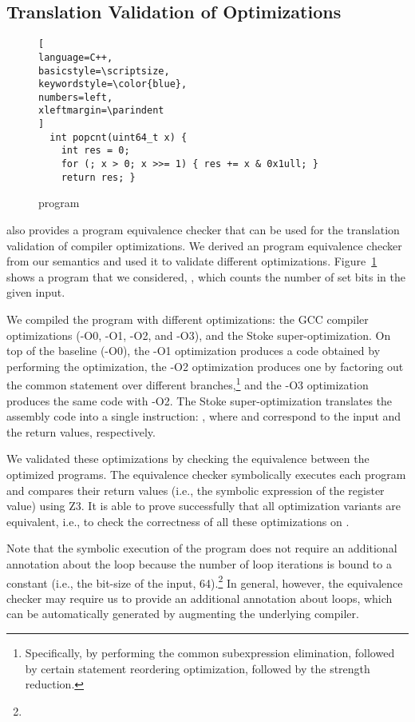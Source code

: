 \subsection{Translation Validation of Optimizations}
\begin{figure}
\begin{lstlisting}[
language=C++,
basicstyle=\scriptsize,
keywordstyle=\color{blue},
numbers=left,
xleftmargin=\parindent
]
  int popcnt(uint64_t x) {
    int res = 0;
    for (; x > 0; x >>= 1) { res += x & 0x1ull; }
    return res; }
\end{lstlisting}
\vspace{-5pt}
\caption{ program}
\label{fig:popcnt}
\end{figure}


\K also provides a program equivalence checker that can be used for the translation validation of compiler optimizations.
We derived an \ISA program equivalence checker from our semantics and used it to validate different optimizations.
Figure~\ref{fig:popcnt} shows a program that we considered, , which counts the number of set bits in the given input.

We compiled the program with different optimizations: the GCC compiler optimizations (-O0, -O1, -O2, and -O3), and the Stoke super-optimization.
On top of the baseline (-O0), the -O1 optimization produces a code obtained by performing the  optimization, the -O2 optimization produces one by factoring out the common statement over different branches,\footnote{Specifically, by performing the common subexpression elimination, followed by certain statement reordering optimization, followed by the strength reduction.} and the -O3 optimization produces the same code with -O2. The Stoke super-optimization translates the assembly code into a single instruction: , where  and  correspond to the input and the return values, respectively.

We validated these optimizations by checking the equivalence between the optimized programs.
The equivalence checker symbolically executes each program and compares their return values (i.e., the symbolic expression of the  register value) using Z3.
It is able to prove successfully that all optimization variants are equivalent, i.e., to check the correctness of all these optimizations on .

Note that the symbolic execution of the  program does not require an additional annotation about the loop because the number of loop iterations is bound to a constant (i.e., the bit-size of the input, 64).\footnote{%
}
In general, however, the equivalence checker may require us to provide an additional annotation about loops, which can be automatically generated by augmenting the underlying compiler.




